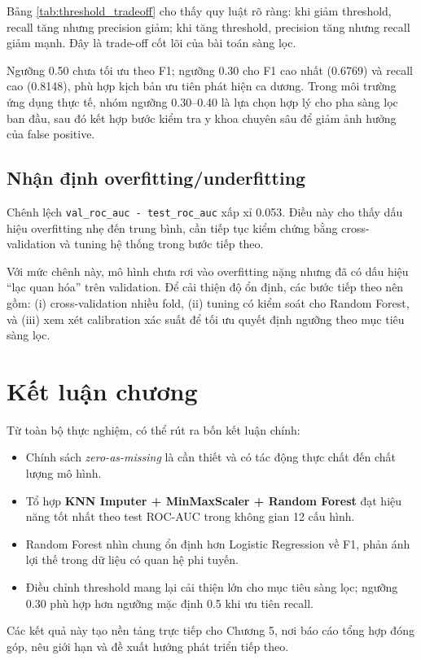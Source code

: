 \noindent
Bảng \ref{tab:threshold_tradeoff} cho thấy quy luật rõ ràng: khi giảm threshold, recall tăng nhưng precision giảm;
khi tăng threshold, precision tăng nhưng recall giảm mạnh. Đây là trade-off cốt lõi của bài toán sàng lọc.

\noindent
Ngưỡng 0.50 chưa tối ưu theo F1; ngưỡng 0.30 cho F1 cao nhất (0.6769) và recall cao (0.8148), phù hợp kịch bản ưu tiên phát hiện ca dương.
Trong môi trường ứng dụng thực tế, nhóm ngưỡng 0.30--0.40 là lựa chọn hợp lý cho pha sàng lọc ban đầu, sau đó kết hợp bước kiểm tra y khoa chuyên sâu
để giảm ảnh hưởng của false positive.

\subsection{Nhận định overfitting/underfitting}
Chênh lệch \texttt{val\_roc\_auc - test\_roc\_auc} xấp xỉ 0.053.
Điều này cho thấy dấu hiệu overfitting nhẹ đến trung bình, cần tiếp tục kiểm chứng bằng
cross-validation và tuning hệ thống trong bước tiếp theo.

\noindent
Với mức chênh này, mô hình chưa rơi vào overfitting nặng nhưng đã có dấu hiệu ``lạc quan hóa'' trên validation.
Để cải thiện độ ổn định, các bước tiếp theo nên gồm: (i) cross-validation nhiều fold, (ii) tuning có kiểm soát cho Random Forest,
và (iii) xem xét calibration xác suất để tối ưu quyết định ngưỡng theo mục tiêu sàng lọc.

\section{Kết luận chương}
Từ toàn bộ thực nghiệm, có thể rút ra bốn kết luận chính:
\begin{itemize}[leftmargin=1.5em]
    \item Chính sách \textit{zero-as-missing} là cần thiết và có tác động thực chất đến chất lượng mô hình.
    \item Tổ hợp \textbf{KNN Imputer + MinMaxScaler + Random Forest} đạt hiệu năng tốt nhất theo test ROC-AUC trong không gian 12 cấu hình.
    \item Random Forest nhìn chung ổn định hơn Logistic Regression về F1, phản ánh lợi thế trong dữ liệu có quan hệ phi tuyến.
    \item Điều chỉnh threshold mang lại cải thiện lớn cho mục tiêu sàng lọc; ngưỡng 0.30 phù hợp hơn ngưỡng mặc định 0.5 khi ưu tiên recall.
\end{itemize}

Các kết quả này tạo nền tảng trực tiếp cho Chương 5, nơi báo cáo tổng hợp đóng góp, nêu giới hạn và đề xuất hướng phát triển tiếp theo.
